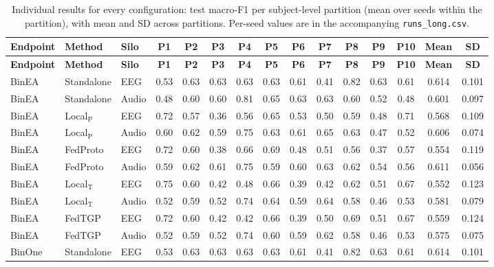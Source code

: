 \setlength{\tabcolsep}{1.5pt}
\begin{longtable}{lllcccccccccccc}
\caption{Individual results for every configuration: test macro-F1 per subject-level partition (mean over seeds within the partition), with mean and SD across partitions. Per-seed values are in the accompanying \texttt{runs\_long.csv}.}\label{tab:individual}\\
\toprule
\textbf{Endpoint} & \textbf{Method} & \textbf{Silo} & \textbf{P1} & \textbf{P2} & \textbf{P3} & \textbf{P4} & \textbf{P5} & \textbf{P6} & \textbf{P7} & \textbf{P8} & \textbf{P9} & \textbf{P10} & \textbf{Mean} & \textbf{SD} \\
\midrule
\endfirsthead
\toprule
\textbf{Endpoint} & \textbf{Method} & \textbf{Silo} & \textbf{P1} & \textbf{P2} & \textbf{P3} & \textbf{P4} & \textbf{P5} & \textbf{P6} & \textbf{P7} & \textbf{P8} & \textbf{P9} & \textbf{P10} & \textbf{Mean} & \textbf{SD} \\
\midrule
\endhead
BinEA & Standalone & EEG & 0.53 & 0.63 & 0.63 & 0.63 & 0.63 & 0.61 & 0.41 & 0.82 & 0.63 & 0.61 & 0.614 & 0.101 \\
BinEA & Standalone & Audio & 0.48 & 0.60 & 0.60 & 0.81 & 0.65 & 0.63 & 0.63 & 0.60 & 0.52 & 0.48 & 0.601 & 0.097 \\
BinEA & Local$_{\mathrm{P}}$ & EEG & 0.72 & 0.57 & 0.36 & 0.56 & 0.65 & 0.53 & 0.50 & 0.59 & 0.48 & 0.71 & 0.568 & 0.109 \\
BinEA & Local$_{\mathrm{P}}$ & Audio & 0.60 & 0.62 & 0.59 & 0.75 & 0.63 & 0.61 & 0.65 & 0.63 & 0.47 & 0.52 & 0.606 & 0.074 \\
BinEA & FedProto & EEG & 0.72 & 0.60 & 0.38 & 0.66 & 0.69 & 0.48 & 0.51 & 0.56 & 0.37 & 0.57 & 0.554 & 0.119 \\
BinEA & FedProto & Audio & 0.59 & 0.62 & 0.61 & 0.75 & 0.59 & 0.60 & 0.63 & 0.62 & 0.54 & 0.56 & 0.611 & 0.056 \\
BinEA & Local$_{\mathrm{T}}$ & EEG & 0.75 & 0.60 & 0.42 & 0.48 & 0.66 & 0.39 & 0.42 & 0.62 & 0.51 & 0.67 & 0.552 & 0.123 \\
BinEA & Local$_{\mathrm{T}}$ & Audio & 0.52 & 0.59 & 0.52 & 0.74 & 0.64 & 0.59 & 0.64 & 0.58 & 0.46 & 0.53 & 0.581 & 0.079 \\
BinEA & FedTGP & EEG & 0.72 & 0.60 & 0.42 & 0.42 & 0.66 & 0.39 & 0.50 & 0.69 & 0.51 & 0.67 & 0.559 & 0.124 \\
BinEA & FedTGP & Audio & 0.52 & 0.59 & 0.52 & 0.74 & 0.60 & 0.59 & 0.62 & 0.58 & 0.46 & 0.53 & 0.575 & 0.075 \\
\midrule
BinOne & Standalone & EEG & 0.53 & 0.63 & 0.63 & 0.63 & 0.63 & 0.61 & 0.41 & 0.82 & 0.63 & 0.61 & 0.614 & 0.101 \\

\end{longtable}
